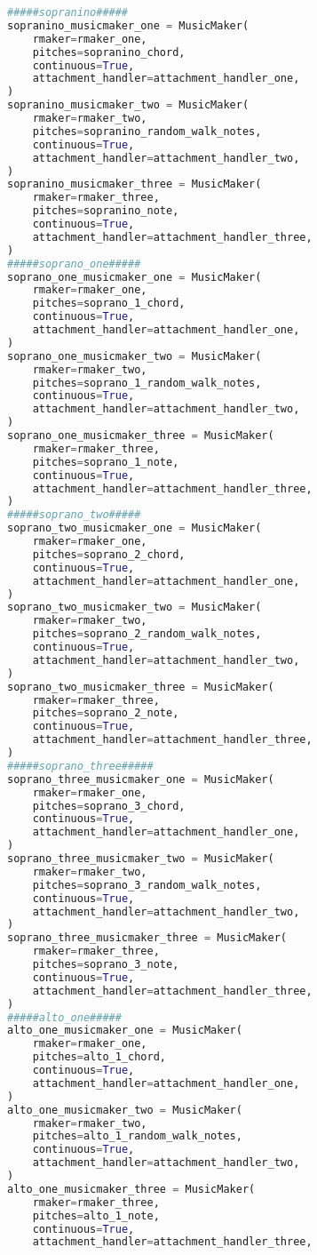 \begin{lstlisting}[language=Python, caption=Invocation Source Code]
#####sopranino#####
sopranino_musicmaker_one = MusicMaker(
    rmaker=rmaker_one,
    pitches=sopranino_chord,
    continuous=True,
    attachment_handler=attachment_handler_one,
)
sopranino_musicmaker_two = MusicMaker(
    rmaker=rmaker_two,
    pitches=sopranino_random_walk_notes,
    continuous=True,
    attachment_handler=attachment_handler_two,
)
sopranino_musicmaker_three = MusicMaker(
    rmaker=rmaker_three,
    pitches=sopranino_note,
    continuous=True,
    attachment_handler=attachment_handler_three,
)
#####soprano_one#####
soprano_one_musicmaker_one = MusicMaker(
    rmaker=rmaker_one,
    pitches=soprano_1_chord,
    continuous=True,
    attachment_handler=attachment_handler_one,
)
soprano_one_musicmaker_two = MusicMaker(
    rmaker=rmaker_two,
    pitches=soprano_1_random_walk_notes,
    continuous=True,
    attachment_handler=attachment_handler_two,
)
soprano_one_musicmaker_three = MusicMaker(
    rmaker=rmaker_three,
    pitches=soprano_1_note,
    continuous=True,
    attachment_handler=attachment_handler_three,
)
#####soprano_two#####
soprano_two_musicmaker_one = MusicMaker(
    rmaker=rmaker_one,
    pitches=soprano_2_chord,
    continuous=True,
    attachment_handler=attachment_handler_one,
)
soprano_two_musicmaker_two = MusicMaker(
    rmaker=rmaker_two,
    pitches=soprano_2_random_walk_notes,
    continuous=True,
    attachment_handler=attachment_handler_two,
)
soprano_two_musicmaker_three = MusicMaker(
    rmaker=rmaker_three,
    pitches=soprano_2_note,
    continuous=True,
    attachment_handler=attachment_handler_three,
)
#####soprano_three#####
soprano_three_musicmaker_one = MusicMaker(
    rmaker=rmaker_one,
    pitches=soprano_3_chord,
    continuous=True,
    attachment_handler=attachment_handler_one,
)
soprano_three_musicmaker_two = MusicMaker(
    rmaker=rmaker_two,
    pitches=soprano_3_random_walk_notes,
    continuous=True,
    attachment_handler=attachment_handler_two,
)
soprano_three_musicmaker_three = MusicMaker(
    rmaker=rmaker_three,
    pitches=soprano_3_note,
    continuous=True,
    attachment_handler=attachment_handler_three,
)
#####alto_one#####
alto_one_musicmaker_one = MusicMaker(
    rmaker=rmaker_one,
    pitches=alto_1_chord,
    continuous=True,
    attachment_handler=attachment_handler_one,
)
alto_one_musicmaker_two = MusicMaker(
    rmaker=rmaker_two,
    pitches=alto_1_random_walk_notes,
    continuous=True,
    attachment_handler=attachment_handler_two,
)
alto_one_musicmaker_three = MusicMaker(
    rmaker=rmaker_three,
    pitches=alto_1_note,
    continuous=True,
    attachment_handler=attachment_handler_three,

\end{lstlisting}
